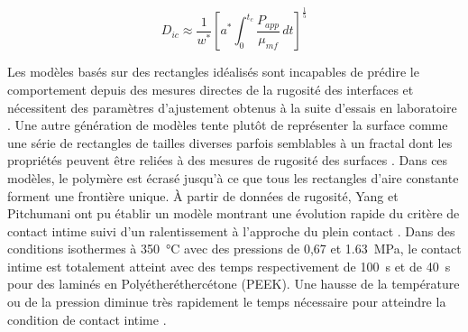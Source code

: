\begin{equation}
D_{ic} \approx \frac{1}{w^*} \left[ a^* \int_{0}^{t_c} \frac{P_{app}}{\mu _{mf}} \, dt \right]^{\frac{1}{5}}
\label{eq:contact_intime}
\end{equation}

Les modèles basés sur des rectangles idéalisés sont incapables de prédire le comportement depuis des mesures directes de la rugosité des interfaces et nécessitent des paramètres d'ajustement obtenus à la suite d'essais en laboratoire \cite{Yang2001}. 
Une autre génération de modèles tente plutôt de représenter la surface comme une série de rectangles de tailles diverses parfois semblables à un fractal dont les propriétés peuvent être reliées à des mesures de rugosité des surfaces \cite{Yang2001,Yang2002}. 
Dans ces modèles, le polymère est écrasé jusqu'à ce que tous les rectangles d'aire constante forment une frontière unique. 
À partir de données de rugosité, Yang et Pitchumani ont pu établir un modèle montrant une évolution rapide du critère de contact intime suivi d'un ralentissement à l'approche du plein contact \cite{Yang2001}. 
Dans des conditions isothermes à \SI[locale=FR]{350}{\celsius} avec des pressions de 0,67 et \SI[locale=FR]{1,63}{\mega\pascal}, le contact intime est totalement atteint avec des temps respectivement de \SI[locale=FR]{100}{\second} et de \SI[locale=FR]{40}{\second} pour des laminés en Polyétheréthercétone (PEEK). 
Une hausse de la température ou de la pression diminue très rapidement le temps nécessaire pour atteindre la condition de contact intime \cite{Yang2002}. 

